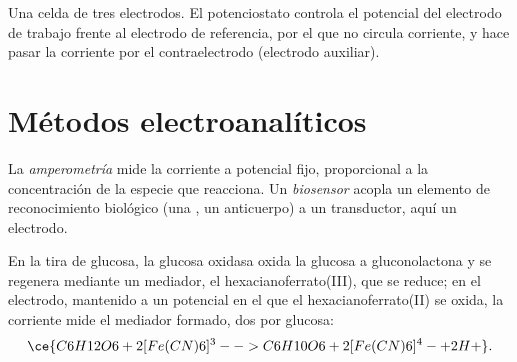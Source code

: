 \begin{omfigure}

{\small Una celda de tres electrodos. El potenciostato controla el potencial del
electrodo de trabajo frente al electrodo de referencia, por el que no circula corriente,
y hace pasar la corriente por el contraelectrodo (electrodo auxiliar).}
\end{omfigure}

\section{Métodos electroanalíticos}

\begin{definition}\label{def:b3:electrode-kinetics:amperometry}
La \emph{amperometría} mide la corriente a potencial fijo,
proporcional a la concentración de la especie que reacciona. Un
\emph{biosensor} acopla un elemento de reconocimiento biológico (una
, un anticuerpo) a un transductor, aquí un electrodo.
\end{definition}

En la tira de glucosa, la glucosa oxidasa oxida la glucosa a gluconolactona y
se regenera mediante un mediador, el hexacianoferrato(III), que se reduce; en el
electrodo, mantenido a un potencial en el que el hexacianoferrato(II) se oxida, la
corriente mide el mediador formado, dos por glucosa:
\[
  \ce{C6H12O6 + 2 [Fe(CN)6]^3- -> C6H10O6 + 2 [Fe(CN)6]^4- + 2 H+} .
\]

